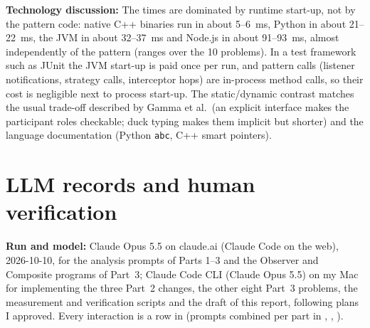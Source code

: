 \documentclass[11pt,a4paper]{article}
\newcommand{\entry}[1]{\textbf{#1:} }
\begin{document}
\entry{Technology discussion}The times are dominated by runtime start-up, not by the pattern code: native C++ binaries run in about 5--6~ms, Python in about 21--22~ms, the JVM in about 32--37~ms and Node.js in about 91--93~ms, almost independently of the pattern (ranges over the 10 problems). In a test framework such as JUnit the JVM start-up is paid once per run, and pattern calls (listener notifications, strategy calls, interceptor hops) are in-process method calls, so their cost is negligible next to process start-up. The static/dynamic contrast matches the usual trade-off described by Gamma et al.\ (an explicit interface makes the participant roles checkable; duck typing makes them implicit but shorter) and the language documentation (Python \texttt{abc}, C++ smart pointers).

\section{LLM records and human verification}
\entry{Run and model}Claude Opus 5.5 on claude.ai (Claude Code on the web), 2026-10-10, for the analysis prompts of Parts 1--3 and the Observer and Composite programs of Part~3; Claude Code CLI (Claude Opus 5.5) on my Mac for implementing the three Part~2 changes, the other eight Part~3 problems, the measurement and verification scripts and the draft of this report, following plans I approved. Every interaction is a row in  (prompts combined per part in , , ).
\end{document}
